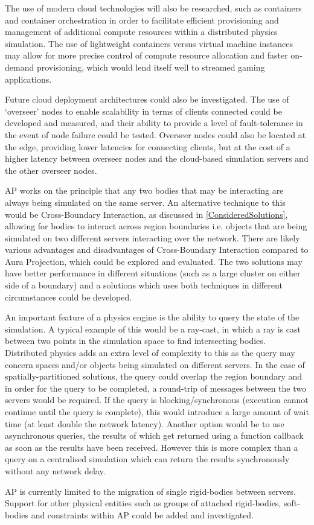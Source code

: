 The use of modern cloud technologies will also be researched, such as containers and container orchestration in order to facilitate efficient provisioning and management of additional compute resources within a distributed physics simulation. The use of lightweight containers versus virtual machine instances may allow for more precise control of compute resource allocation and faster on-demand provisioning, which would lend itself well to streamed gaming applications.

Future cloud deployment architectures could also be investigated. The use of `overseer' nodes to enable scalability in terms of clients connected could be developed and measured, and their ability to provide a level of fault-tolerance in the event of node failure could be tested. Overseer nodes could also be located at the edge, providing lower latencies for connecting clients, but at the cost of a higher latency between overseer nodes and the cloud-based simulation servers and the other overseer nodes.


AP works on the principle that any two bodies that may be interacting are always being simulated on the same server. An alternative technique to this would be Cross-Boundary Interaction, as discussed in \ref{ConsideredSolutions}, allowing for bodies to interact across region boundaries i.e. objects that are being simulated on two different servers interacting over the network. There are likely various advantages and disadvantages of Cross-Boundary Interaction compared to Aura Projection, which could be explored and evaluated. The two solutions may have better performance in different situations (such as a large cluster on either side of a boundary) and a solutions which uses both techniques in different circumstances could be developed.

An important feature of a physics engine is the ability to query the state of the simulation. A typical example of this would be a ray-cast, in which a ray is cast between two points in the simulation space to find intersecting bodies. %
Distributed physics adds an extra level of complexity to this as the query may concern spaces and/or objects being simulated on different servers. In the case of spatially-partitioned solutions, the query could overlap the region boundary and in order for the query to be completed, a round-trip of messages between the two servers would be required. If the query is blocking/synchronous (execution cannot continue until the query is complete), this would introduce a large amount of wait time (at least double the network latency). Another option would be to use asynchronous queries, the results of which get returned using a function callback as soon as the results have been received. However this is more complex than a query on a centralised simulation which can return the results synchronously without any network delay.

AP is currently limited to the migration of single rigid-bodies between servers. Support for other physical entities such as groups of attached rigid-bodies, soft-bodies and constraints within AP could be added and investigated.